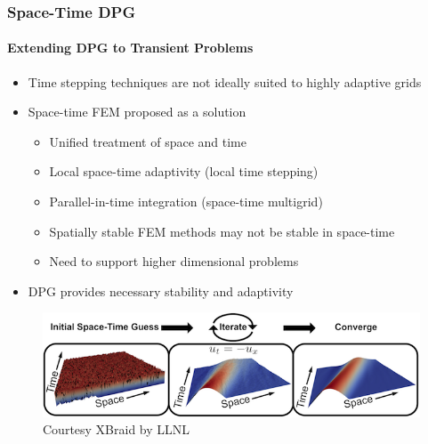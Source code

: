 \documentclass[18pt,xcolor=table]{beamer}
\begin{document}


\begin{frame}[t]
\frametitle{Space-Time DPG}
\framesubtitle{Extending DPG to Transient Problems}
\begin{itemize}
  \item Time stepping techniques are not ideally suited to highly adaptive grids
  \item Space-time FEM proposed as a solution
  \begin{itemize}
    \item[\textcolor{green}{\Checkmark}] Unified treatment of space and time
    \item[\textcolor{green}{\Checkmark}] Local space-time adaptivity (local time stepping)
    \item[\textcolor{green}{\Checkmark}] Parallel-in-time integration (space-time multigrid)
    \item[\XSolidBrush] Spatially stable FEM methods may not be stable in space-time
    \item[\XSolidBrush] Need to support higher dimensional problems
  \end{itemize}
  \item DPG provides necessary stability and adaptivity
\end{itemize}
\begin{figure}[b]
\centering
\includegraphics[width=1.0\textwidth]{Schematics/XBraid}
\\\small{Courtesy XBraid by LLNL}
\end{figure}
\end{frame}
\end{document}
